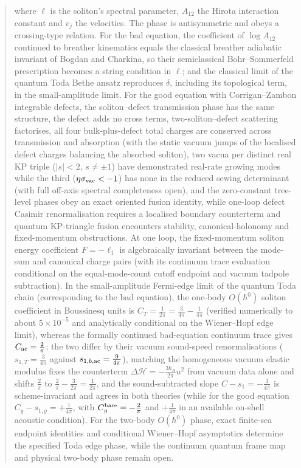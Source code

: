 \documentclass[11pt,a4paper]{article}
\newcommand{\hb}{\hbar}
\theoremstyle{remark}
\begin{document}
\begin{abstract}
where $\ell$ is the soliton's spectral parameter, $A_{12}$ the Hirota interaction constant and $v_j$ the velocities. The phase is antisymmetric and obeys a crossing-type relation. For the bad equation, the coefficient of $\log A_{12}$ continued to breather kinematics equals the classical breather adiabatic invariant of Bogdan and Charkina, so their semiclassical Bohr--Sommerfeld prescription becomes a string condition in $\ell$; and the classical limit of the quantum Toda Bethe ansatz reproduces $\delta$, including its topological term, in the small-amplitude limit. For the good equation with Corrigan--Zambon integrable defects, the soliton--defect transmission phase has the same structure, the defect adds no cross terms, two-soliton--defect scattering factorises, all four bulk-plus-defect total charges are conserved across transmission and absorption (with the static vacuum jumps of the localised defect charges balancing the absorbed soliton), two vacua per distinct real KP triple ($|s|<2$, $s\neq\pm1$) have demonstrated real-rate growing modes while the third ($\eta\sigma_{\rm vac}<-1$) has none in the reduced sewing determinant (with full off-axis spectral completeness open), and the zero-constant tree-level phases obey an exact oriented fusion identity, while one-loop defect Casimir renormalisation requires a localised boundary counterterm and quantum KP-triangle fusion encounters stability, canonical-holonomy and fixed-momentum obstructions. At one loop, the fixed-momentum soliton energy coefficient $F=-\ell_1$ is algebraically invariant between the mode-sum and canonical charge pairs (with its continuum trace evaluation conditional on the equal-mode-count cutoff endpoint and vacuum tadpole subtraction). In the small-amplitude Fermi-edge limit of the quantum Toda chain (corresponding to the bad equation), the one-body $O(\hb^0)$ soliton coefficient in Boussinesq units is $C_T=\tfrac1{2\pi}=\tfrac3{4\pi}-\tfrac1{4\pi}$ (verified numerically to about $5\times10^{-5}$ and analytically conditional on the Wiener--Hopf edge limit), whereas the formally continued bad-equation continuum trace gives $C_{\rm ac}=\tfrac2\pi$; the two differ by their vacuum sound-speed renormalisations ($s_{1,T}=\tfrac3{4\pi}$ against $s_{1,b,{\rm ac}}=\tfrac9{4\pi}$), matching the homogeneous vacuum elastic modulus fixes the counterterm $\Delta\mathcal H=-\tfrac{3\hb_B}{2\pi}u^2$ from vacuum data alone and shifts $\tfrac2\pi$ to $\tfrac2\pi-\tfrac3{2\pi}=\tfrac1{2\pi}$, and the sound-subtracted slope $C-s_1=-\tfrac1{4\pi}$ is scheme-invariant and agrees in both theories (while for the good equation $C_g-s_{1,g}=+\tfrac1{4\pi}$, with $C_g^{\rm bare}=-\tfrac2\pi$ and $+\tfrac1{4\pi}$ in an available on-shell acoustic condition). For the two-body $O(\hb^0)$ phase, exact finite-sea endpoint identities and conditional Wiener--Hopf asymptotics determine the specified Toda edge phase, while the continuum quantum frame map and physical two-body phase remain open.
\end{abstract}
\end{document}
